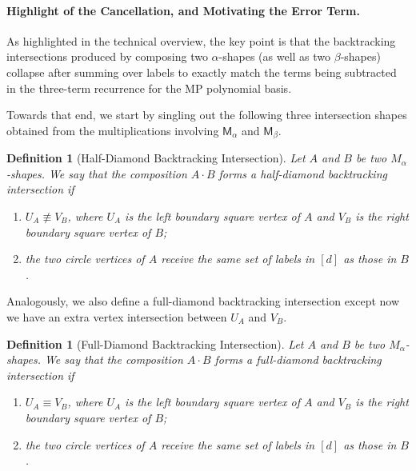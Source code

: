 \documentclass[12pt]{article}
\def \al {\alpha}
\newtheorem{definition}[theorem]{Definition}
\newcommand{\cm}{\mathsf{M} }
\newcommand{\Authornote}[3]{{\sf\footnotesize\color{#3}{[#1: #2]}}}
\newcommand{\Authornote}[3]{}
\newcommand{\snote}[1]{\Authornote{Sofia}{#1}{orange}}
\begin{document}
\paragraph{Highlight of the Cancellation, and Motivating the Error Term.}
As highlighted in the technical overview, the key point is that the backtracking
intersections produced by composing two \(\alpha\)-shapes (as well as two $\beta$-shapes) collapse after
summing over labels to exactly match the terms being subtracted in the three-term
recurrence for the MP polynomial basis.

Towards that end, we start by singling out the following three intersection shapes obtained from the multiplications involving $\cm_\al$ and $\cm_\beta$.
\begin{definition}[Half-Diamond Backtracking Intersection]
Let \(A\) and \(B\) be two \(M_\alpha\)-shapes. We say that the composition
\(A\cdot  B\) forms a \emph{half-diamond backtracking intersection} if
\begin{enumerate}
    \item \(U_A \not\equiv V_B\), where \(U_A\) is the left boundary square
    vertex of \(A\) and \(V_B\) is the right boundary square vertex of \(B\);

    \item the two circle vertices of \(A\) receive the same set of labels in $[d]$ as those in $B$.
\end{enumerate}
\end{definition}

Analogously, we also define a full-diamond backtracking intersection except now we have an extra vertex intersection between $U_A$ and $V_B$.
\begin{definition}[Full-Diamond Backtracking Intersection]
Let \(A\) and \(B\) be two \(M_\alpha\)-shapes. We say that the composition
\(A\cdot  B\) forms a \emph{full-diamond backtracking intersection} if
\begin{enumerate}
    \item \(U_A  \equiv V_B\), where \(U_A\) is the left boundary square
    vertex of \(A\) and \(V_B\) is the right boundary square vertex of \(B\);

    \item the two circle vertices of \(A\) receive the same set of labels in $[d]$ as those in $B$.
\end{enumerate}
\end{definition}
\end{document}
